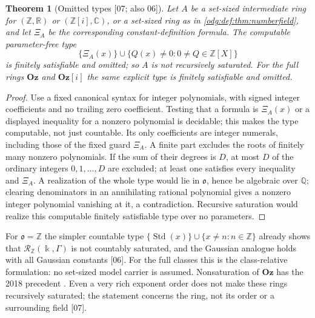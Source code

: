 \documentclass[11pt,oneside]{article}
\numberwithin{equation}{section}
\newtheorem{theorem}{Theorem}[section]
\theoremstyle{definition}
\theoremstyle{remark}
\newcommand{\Oz}{\mathbf{Oz}}
\newcommand{\Z}{\mathbb Z}
\newcommand{\Q}{\mathbb Q}
\newcommand{\R}{\mathbb R}
\newcommand{\C}{\mathbb C}
\newcommand{\Std}{\operatorname{Std}}
\newcommand{\src}[1]{\textup{\textsf{\small[#1]}}}
\newcommand{\Og}{\Oz[i]}
\begin{document}
\begin{theorem}[Omitted types \src{07; also 06}]\label{odg:def:thm:saturation}
Let $A$ be a set-sized intermediate ring for $(\Z,\R)$ or $(\Z[i],\C)$, or a
set-sized ring as in \cref{odg:def:thm:numberfield}, and let $\Xi_A$ be the
corresponding constant-definition formula. The computable parameter-free type
\[
 \{\Xi_A(x)\}\cup\{Q(x)\ne0:0\ne Q\in\Z[X]\}
\]
is finitely satisfiable and omitted; so $A$ is not recursively saturated. For
the full rings $\Oz$ and $\Og$ the same explicit type is finitely satisfiable
and omitted.
\end{theorem}
\begin{proof}
Use a fixed canonical syntax for integer polynomials, with signed integer
coefficients and no trailing zero coefficient. Testing that a formula is
$\Xi_A(x)$ or a displayed inequality for a nonzero polynomial is decidable;
this makes the type computable, not just countable. Its only coefficients
are integer numerals, including those of the fixed guard $\Xi_A$.
A finite part excludes the roots of finitely many nonzero polynomials.
If the sum of their degrees is $D$, at most $D$ of the ordinary integers
$0,1,\ldots,D$ are excluded; at least one satisfies every inequality and
$\Xi_A$. A realization of the whole type would lie in $\mathfrak o$, hence
be algebraic over $\Q$; clearing denominators in an annihilating rational
polynomial gives a nonzero integer polynomial vanishing at it, a
contradiction. Recursive saturation would realize this computable finitely
satisfiable type over no parameters.
\end{proof}

For $\mathfrak o=\Z$ the simpler countable type $\{\Std(x)\}\cup\{x\ne n:n\in\Z\}$
already shows that $\mathcal R_\Z(\Bbbk,\Gamma)$ is not countably saturated, and
the Gaussian analogue holds with all Gaussian constants \src{06}. For the full
classes this is the class-relative formulation: no set-sized model carrier is
assumed. Nonsaturation of $\Oz$ has the 2018 precedent \cite{Nombre}. Even a
very rich exponent order does not make these rings recursively saturated; the
statement concerns the ring, not its order or a surrounding field \src{07}.
\end{document}
